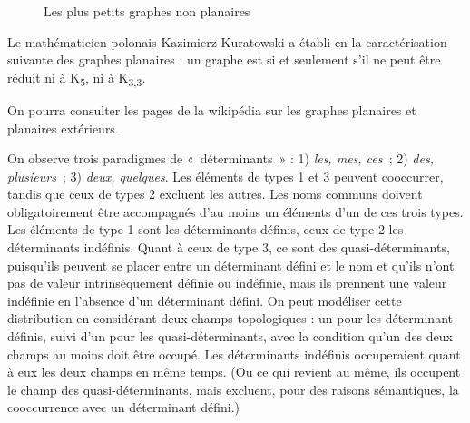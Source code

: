 { \begin{figure}[H]
 \caption{Les plus petits graphes non planaires\label{fig:K5}}
    \begin{minipage}[c]{.5\linewidth}\centering
    \end{minipage}\begin{minipage}[c]{.5\linewidth}\centering
    \end{minipage}
    \end{figure}

    Le mathématicien polonais Kazimierz Kuratowski a établi en \citeyear{kuratowski1930probleme} la caractérisation suivante des graphes planaires : un graphe est  si et seulement s’il ne peut être réduit ni à K\textsubscript{5}, ni à K\textsubscript{3,3}.

    On pourra consulter les pages de la wikipédia sur les graphes planaires et planaires extérieurs.

     On observe trois paradigmes de «~déterminants~» : 1) \textit{les, mes, ces~}; 2) \textit{des, plusieurs~}; 3) \textit{deux, quelques}. Les éléments de types 1 et 3 peuvent cooccurrer, tandis que ceux de types 2 excluent les autres. Les noms communs doivent obligatoirement être accompagnés d’au moins un éléments d’un de ces trois types. Les éléments de type 1 sont les déterminants définis, ceux de type 2 les déterminants indéfinis. Quant à ceux de type 3, ce sont des quasi-déterminants, puisqu’ils peuvent se placer entre un déterminant défini et le nom et qu’ils n’ont pas de valeur intrinsèquement définie ou indéfinie, mais ils prennent une valeur indéfinie en l’absence d’un déterminant défini. On peut modéliser cette distribution en considérant deux champs topologiques : un pour les déterminant définis, suivi d’un pour les quasi-déterminants, avec la condition qu’un des deux champs au moins doit être occupé. Les déterminants indéfinis occuperaient quant à eux les deux champs en même temps. (Ou ce qui revient au même, ils occupent le champ des quasi-déterminants, mais excluent, pour des raisons sémantiques, la cooccurrence avec un déterminant défini.)

}
